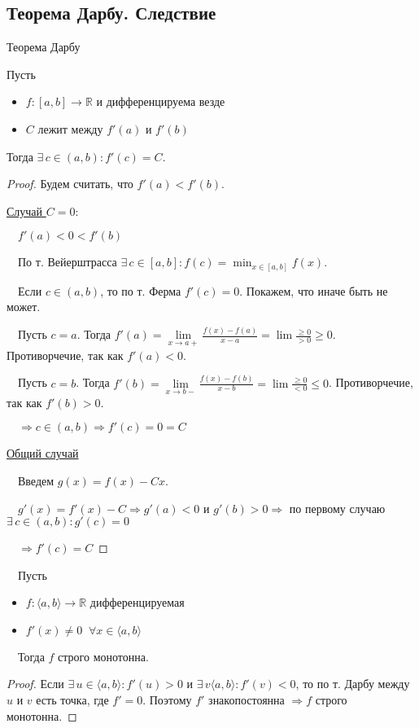 \subsection{Теорема Дарбу. Следствие \href{https://youtu.be/OXDjegAsmSU?t=7706}{\Walley}}
\begin{theorem-non}
    Теорема Дарбу

    Пусть 
    \begin{itemize}
        \item $f: [a, b] \to \mathbb{R}$ и дифференцируема везде
        \item $C$ лежит между $f'(a)$ и $f'(b)$
    \end{itemize}
    Тогда $\exists \, c \in (a, b) : f'(c) = C$.
\end{theorem-non}
\begin{proof}
    Будем считать, что $f'(a) < f'(b)$.

    \underline{Случай $C = 0$}:

    $\quad f'(a) < 0 < f'(b)$

    $\quad$По т. Вейерштрасса $\exists \, c \in [a, b] : f(c) = \min_{x \in [a, b]} f(x)$. 
    
    $\quad$Если $c \in (a, b)$, то по т. Ферма $f'(c) = 0$. Покажем, что иначе быть не может.

    $\quad$Пусть $c = a$. Тогда $f'(a) = \lim\limits_{x \to a+} \frac{f(x) - f(a)}{x - a} = \lim \frac{\geqslant 0}{> 0} \geqslant 0$. Противорчечие, так как $f'(a) < 0$.

    $\quad$Пусть $c = b$. Тогда $f'(b) = \lim\limits_{x \to b-} \frac{f(x) - f(b)}{x - b} = \lim \frac{\geqslant 0}{< 0} \leqslant 0$. Противорчечие, так как $f'(b) > 0$.

    $\quad \Rightarrow c \in (a, b) \Rightarrow f'(c) = 0 = C$
    
    \underline{Общий случай}

    $\quad$Введем $g(x) = f(x) - Cx$. 

    $\quad g'(x) = f'(x) - C \Rightarrow g'(a) < 0$ и $g'(b) > 0 \Rightarrow$ по первому случаю $\exists \, c \in (a, b) : g'(c) = 0$
    
    $\quad \Rightarrow f'(c) = C$
\end{proof}
\begin{follow} 

    $\quad$Пусть
    \begin{itemize}
        \item $f: \langle a, b \rangle \to \mathbb{R}$ дифференцируемая
        \item $f'(x) \neq 0 \;\; \forall x \in \langle a, b \rangle$
    \end{itemize}    
    $\quad$Тогда $f$ строго монотонна.
\end{follow}
\begin{proof}
    Если $\exists \, u \in \langle a, b \rangle : f'(u) > 0$ и $\exists \, v \langle a, b \rangle : f'(v) < 0$, то по т. Дарбу между $u$ и $v$ есть точка, где $f' = 0$. Поэтому $f'$ знакопостоянна $\Rightarrow f$ строго монотонна. 
\end{proof}